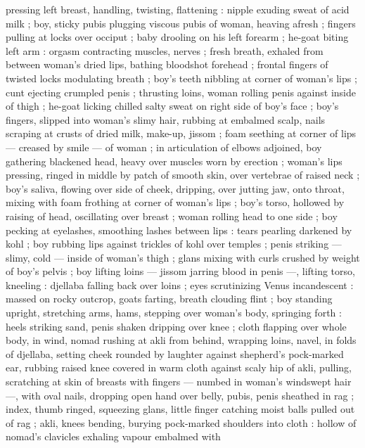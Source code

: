 pressing left breast, handling, twisting, flattening : nipple exuding 
sweat of acid milk ; boy, sticky pubis plugging viscous pubis of 
woman, heaving afresh ; fingers pulling at locks over occiput ; baby 
drooling on his left forearm ; he-goat biting left arm : orgasm 
contracting muscles, nerves ; fresh breath, exhaled from between 
woman's dried lips, bathing bloodshot forehead ; frontal fingers of 
twisted locks modulating breath ; boy's teeth nibbling at corner of 
woman's lips ; cunt ejecting crumpled penis ; thrusting loins, woman 
rolling penis against inside of thigh ; he-goat licking chilled salty 
sweat on right side of boy's face ; boy's fingers, slipped into 
woman's slimy hair, rubbing at embalmed scalp, nails scraping at 
crusts of dried milk, make-up, jissom ; foam seething at corner of 
lips --- creased by smile --- of woman ; in articulation of elbows 
adjoined, boy gathering blackened head, heavy over muscles worn 
by erection ; woman's lips pressing, ringed in middle by patch of 
smooth skin, over vertebrae of raised neck ; boy's saliva, flowing 
over side of cheek, dripping, over jutting jaw, onto throat, mixing with 
foam frothing at corner of woman's lips ; boy's torso, hollowed by 
raising of head, oscillating over breast ; woman rolling head to one 
side ; boy pecking at eyelashes, smoothing lashes between lips : 
tears pearling darkened by kohl ; boy rubbing lips against trickles of 
kohl over temples ; penis striking --- slimy, cold --- inside of 
woman's thigh ; glans mixing with curls crushed by weight of boy's 
pelvis ; boy lifting loins --- jissom jarring blood in penis ---, lifting 
torso, kneeling : djellaba falling back over loins ; eyes scrutinizing 
Venus incandescent : massed on rocky outcrop, goats farting, breath 
clouding flint ; boy standing upright, stretching arms, hams, stepping 
over woman's body, springing forth : heels striking sand, penis 
shaken dripping over knee ; cloth flapping over whole body, in wind, 
nomad rushing at akli from behind, wrapping loins, navel, in folds of 
djellaba, setting cheek rounded by laughter against shepherd's 
pock-marked ear, rubbing raised knee covered in warm cloth against 
scaly hip of akli, pulling, scratching at skin of breasts with fingers --- 
numbed in woman's windswept hair ---, with oval nails, dropping 
open hand over belly, pubis, penis sheathed in rag ; index, thumb 
ringed, squeezing glans, little finger catching moist balls pulled out 
of rag ; akli, knees bending, burying pock-marked shoulders into 
cloth : hollow of nomad's clavicles exhaling vapour embalmed with 
